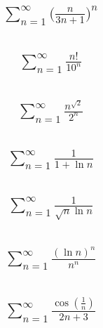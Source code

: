 \documentclass{article}
\begin{document}
\subsection{
	\begin{align*}
		\sum_{n = 1}^{\infty} \bigg( \frac{n}{3n + 1} \bigg)^n
	\end{align*}
}

\subsection{
	\begin{align*}
		\sum_{n = 1}^{\infty} \frac{n!}{10^n}
	\end{align*}
}

\subsection{
	\begin{align*}
		\sum_{n = 1}^{\infty} \frac{n^{\sqrt{2}}}{2^n}
	\end{align*}
}

\subsection{
	\begin{align*}
		\sum_{n = 1}^{\infty} \frac{1}{1 +\ln{n}}
	\end{align*}
}

\subsection{
	\begin{align*}
		\sum_{n = 1}^{\infty} \frac{1}{\sqrt{n} \ln{n}}
	\end{align*}
}

\subsection{
	\begin{align*}
		\sum_{n = 1}^{\infty} \frac{(\ln{n})^n}{n^n}
	\end{align*}
}

\subsection{
	\begin{align*}
		\sum_{n = 1}^{\infty} \frac{\cos{(\frac{1}{n})}}{2n + 3}
	\end{align*}
}
\end{document}
